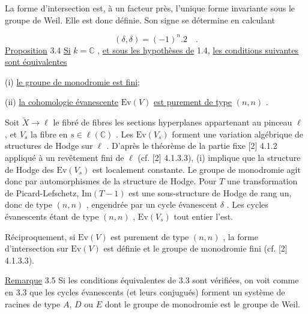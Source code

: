 La forme d'intersection est, à un facteur près, l'unique forme invariante sous le groupe de Weil. Elle est donc définie. Son signe se détermine en calculant

\begin{equation*}
(\delta, \delta) = (-1)^n . 2 \quad .
\end{equation*}
\underline{Proposition} 3.4 \quad \underline{Si} $k = \mathbb{C}$ , \underline{et sous les hypothèses de} 1.4, \underline{les conditions suivantes sont équivalentes}

(i) \underline{le groupe de monodromie est fini};

(ii) \underline{la cohomologie évanescente} $\mathrm{Ev}(V)$ \underline{est purement de type} $(n, n)$ .

Soit $\widetilde{X} \longrightarrow \ell$ le fibré de fibres les sections hyperplanes appartenant au pinceau $\ell$ , et $V_s$ la fibre en $s \in \ell(\mathbb{C})$ . Les $\mathrm{Ev}(V_s)$ forment une variation algébrique de structures de Hodge sur $\ell$ . D'après le théorème de la partie fixe [2] 4.1.2 appliqué à un revêtement fini de $\ell$ (cf. [2] 4.1.3.3), (i) implique que la structure de Hodge des $\mathrm{Ev}(V_s)$ est localement constante. Le groupe de monodromie agit donc par automorphismes de la structure de Hodge. Pour $T$ une transformation de Picard-Lefschetz, $\mathrm{Im}(T-1)$ est une sous-structure de Hodge de rang un, donc de type $(n, n)$ , engendrée par un cycle évanescent $\delta$ . Les cycles évanescents étant de type $(n, n)$ , $\mathrm{Ev}(V_s)$ tout entier l'est.

Réciproquement, si $\mathrm{Ev}(V)$ est purement de type $(n, n)$ , la forme d'intersection sur $\mathrm{Ev}(V)$ est définie et le groupe de monodromie fini (cf. [2] 4.1.3.3).



\underline{Remarque} 3.5 \quad Si les conditions équivalentes de 3.3 sont vérifiées, on voit comme en 3.3 que les cycles évanescents (et leurs conjugués) forment un système de racines de type $A$, $D$ ou $E$ dont le groupe de monodromie est le groupe de Weil.


